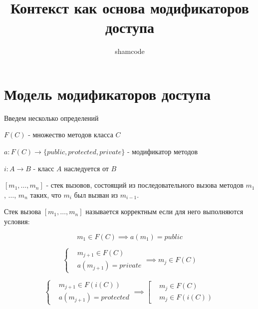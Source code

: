 \documentclass[graybox]{svmult}
\begin{document}
\title*{Контекст как основа модификаторов доступа}
\author{shamcode}
\maketitle

\section{Модель модификаторов доступа}
\label{sec:1}
Введем несколько определений
\begin{definition}
$F(C)$ - множество методов класса $C$
\end{definition}

\begin{definition}
$a: F(C) \to \{public, protected, private\}$ - модификатор методов
\end{definition}

\begin{definition}
$i: A \to B$ - класс $A$ наследуется от $B$
\end{definition}

\begin{definition}
$[m_1, \dots, m_n]$ - стек вызовов, состоящий из последовательного вызова методов $m_1$, $\dots$, $m_n$ таких, что $m_i$ был вызван из $m_{i-1}$.
\end{definition}


\begin{definition}
\label{correct_stack}
Стек вызова  $[m_1, \dots, m_n]$ называется корректным если для него выполняются условия:

\begin{equation}
\label{first_method_public}
m_1 \in F(C) \implies a(m_1) = public
\end{equation}

\begin{equation}
\label{private}
\left\{
\begin{aligned}
&m_{j+1} \in F(C) \\
&a(m_{j+1}) = private
\end{aligned}
\right. 
\implies m_j \in F(C)
\end{equation}

\begin{equation}
\label{protected}
\left\{
	\begin{aligned}
		&m_{j+1} \in F(i(C)) \\
		&a(m_{j+1}) = protected
	\end{aligned}
\right.
\implies
\left[
	\begin{aligned}
		&m_j \in F(C) \\
		&m_j \in F(i(C))
	\end{aligned}
\right.
\end{equation}

\end{definition}
\end{document}
